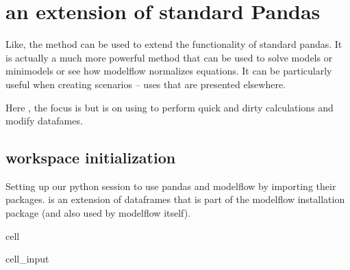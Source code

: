 \documentclass[letterpaper,10pt,english]{jupyterBook}
\begin{document}
\section{ an extension of standard Pandas}
\label{\detokenize{content/04_PythonEssentials/mfcalc:mfcalc-an-extension-of-standard-pandas}}\label{\detokenize{content/04_PythonEssentials/mfcalc::doc}}
\sphinxAtStartPar
Like, the  method can be used to extend the functionality of standard pandas.  It is actually a much more powerful method that can be used to solve models or mini\sphinxhyphen{}models or see how modelflow normalizes equations.  It can be particularly useful when creating scenarios – uses that are presented elsewhere.

\sphinxAtStartPar
Here , the focus is but is on using to perform quick and dirty calculations and modify datafames.


\subsection{workspace initialization}
\label{\detokenize{content/04_PythonEssentials/mfcalc:workspace-initialization}}
\sphinxAtStartPar
Setting up our python session to use pandas and modelflow by importing their packages.   is an extension of dataframes that is part of the modelflow installation package (and also used by modelflow itself).

\begin{sphinxuseclass}{cell}\begin{sphinxVerbatimInput}

\begin{sphinxuseclass}{cell_input}
\begin{sphinxVerbatim}[commandchars=\\\{\}]
     
        
\end{sphinxVerbatim}

\end{sphinxuseclass}\end{sphinxVerbatimInput}

\end{sphinxuseclass}
\end{document}
